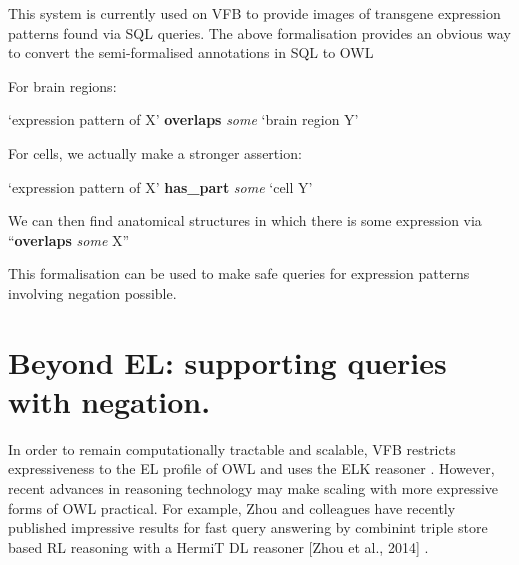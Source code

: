 \documentclass[runningheads,a4paper]{llncs}
\begin{document}
 
This system is currently used on VFB to provide images of transgene
expression patterns found via SQL queries. The above formalisation
provides an obvious way to convert the semi-formalised annotations in
SQL to OWL

For brain regions: 

`expression pattern of X' \textbf{overlaps} \textit{some} `brain region Y'

For cells, we actually make a stronger assertion:

`expression pattern of X' \textbf{has\_part} \textit{some} `cell Y'

We can then find anatomical structures in which there is some
expression via ``\textbf{overlaps} \textit{some} X''

This formalisation can be used to make safe queries for expression
patterns involving negation possible.





% 

 
\section{Beyond EL: supporting queries with negation.}

In order to remain computationally tractable and scalable, VFB
restricts expressiveness to the EL profile of OWL and uses the ELK
reasoner \cite{kazakov2012elk}.  However, recent advances in reasoning
technology may make scaling with more expressive forms of OWL
practical. For example, Zhou and colleagues have recently published
impressive results for fast query answering by combinint triple store
based RL reasoning with a HermiT DL reasoner [Zhou et al., 2014]
\cite{ZNCH14a}.
\end{document}
